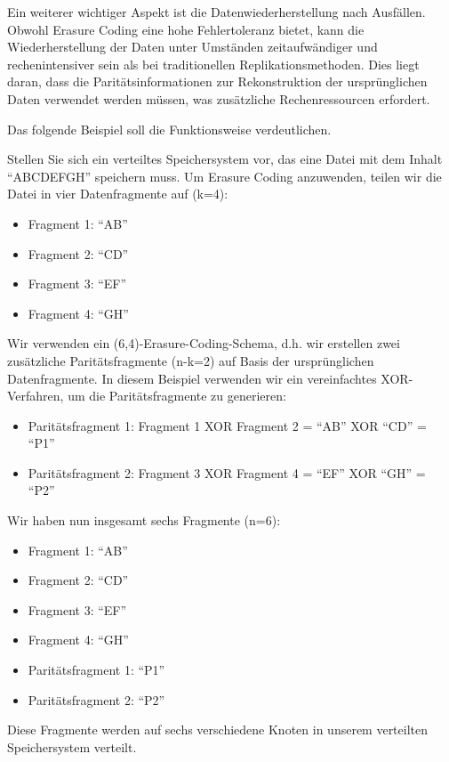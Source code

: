 Ein weiterer wichtiger Aspekt ist die Datenwiederherstellung nach Ausfällen. Obwohl Erasure Coding eine hohe Fehlertoleranz bietet, kann die Wiederherstellung der Daten unter Umständen zeitaufwändiger und rechenintensiver sein als bei traditionellen Replikationsmethoden. Dies liegt daran, dass die Paritätsinformationen zur Rekonstruktion der ursprünglichen Daten verwendet werden müssen, was zusätzliche Rechenressourcen erfordert.

Das folgende Beispiel soll die Funktionsweise verdeutlichen. 

Stellen Sie sich ein verteiltes Speichersystem vor, das eine Datei mit dem Inhalt \enquote{ABCDEFGH} speichern muss. Um Erasure Coding anzuwenden, teilen wir die Datei in vier Datenfragmente auf (k=4):
\begin{itemize}
\item Fragment 1: \enquote{AB}
\item Fragment 2: \enquote{CD}
\item Fragment 3: \enquote{EF}
\item Fragment 4: \enquote{GH}
\end{itemize}
Wir verwenden ein (6,4)-Erasure-Coding-Schema, d.h. wir erstellen zwei zusätzliche Paritätsfragmente (n-k=2) auf Basis der ursprünglichen Datenfragmente. In diesem Beispiel verwenden wir ein vereinfachtes XOR-Verfahren, um die Paritätsfragmente zu generieren:
\begin{itemize}
\item Paritätsfragment 1: Fragment 1 XOR Fragment 2 = \enquote{AB} XOR \enquote{CD} = \enquote{P1}
\item Paritätsfragment 2: Fragment 3 XOR Fragment 4 = \enquote{EF} XOR \enquote{GH} = \enquote{P2}
\end{itemize}
Wir haben nun insgesamt sechs Fragmente (n=6):
\begin{itemize}
\item Fragment 1: \enquote{AB}
\item Fragment 2: \enquote{CD}
\item Fragment 3: \enquote{EF}
\item Fragment 4: \enquote{GH}
\item Paritätsfragment 1: \enquote{P1}
\item Paritätsfragment 2: \enquote{P2}
\end{itemize}  

Diese Fragmente werden auf sechs verschiedene Knoten in unserem verteilten Speichersystem verteilt.

